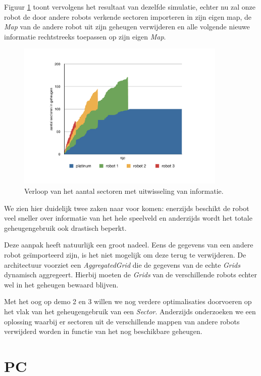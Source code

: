 \documentclass[12pt,a4paper]{report}
\begin{document}
Figuur \ref{chart:sectors-with-merge} toont vervolgens het resultaat van dezelfde simulatie, echter nu zal onze robot de door andere robots verkende sectoren importeren in zijn eigen map, de \emph{Map} van de andere robot uit zijn geheugen verwijderen en alle volgende nieuwe informatie rechtstreeks toepassen op zijn eigen \emph{Map}.

\begin{figure}[htbp]
  \centering
  \includegraphics[width=100mm]{resources/sectors-with-merge.pdf}
  \caption{Verloop van het aantal sectoren met uitwisseling van informatie.}
  \label{chart:sectors-with-merge}
\end{figure}

We zien hier duidelijk twee zaken naar voor komen: enerzijds beschikt de robot veel sneller over informatie van het hele speelveld en anderzijds wordt het totale geheugengebruik ook drastisch beperkt.

Deze aanpak heeft natuurlijk een groot nadeel. Eens de gegevens van een andere robot ge\"importeerd zijn, is het niet mogelijk om deze terug te verwijderen. De architectuur voorziet een \emph{AggregatedGrid} die de gegevens van de echte \emph{Grids} dynamisch aggregeert. Hierbij moeten de \emph{Grids}  van de verschillende robots echter wel in het geheugen bewaard blijven.

Met het oog op demo 2 en 3 willen we nog verdere optimalisaties doorvoeren op het vlak van het geheugengebruik van een \emph{Sector}. Anderzijds onderzoeken we een oplossing waarbij er sectoren uit de verschillende mappen van andere robots verwijderd worden in functie van het nog beschikbare geheugen.

\section{PC}
\end{document}
